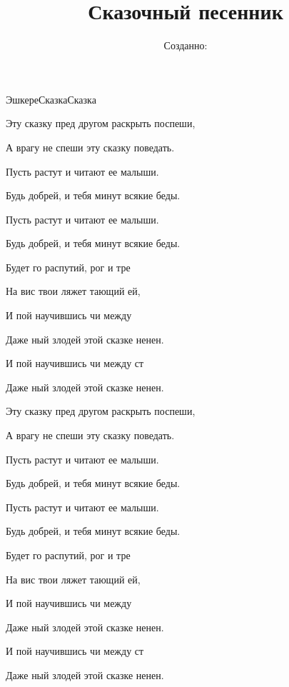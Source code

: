 \documentclass[11pt,a5paper]{book}
\title{ Сказочный песенник}
\author{}
\date{Созданно:  \RevDate}
\begin{document}
 
\maketitle

\mainmatter

\begin{song}{Эшкере}{}{Сказка}{Сказка}{}{}

Эту сказку пред другом раскрыть поспеши,\par
А врагу не спеши эту сказку поведать.\par
Пусть растут и читают ее малыши.\par
Будь добрей, и тебя минут всякие беды.\par
Пусть растут и читают ее малыши.\par
Будь добрей, и тебя минут всякие беды.

\begin{SBVerse*}
Будет го распутий, рог и тре\par
На вис твои ляжет тающий ей, \par
И пой научившись чи между  \par
Даже ный злодей  этой сказке ненен. \par
И пой научившись чи между ст \par
Даже ный злодей  этой сказке ненен.
\end{SBVerse*}

Эту сказку пред другом раскрыть поспеши,\par
А врагу не спеши эту сказку поведать.\par
Пусть растут и читают ее малыши.\par
Будь добрей, и тебя минут всякие беды.\par
Пусть растут и читают ее малыши.\par
Будь добрей, и тебя минут всякие беды.\par
\newpage

\begin{SBVerse*}
Будет го распутий, рог и тре\par
На вис твои ляжет тающий ей, \par
И пой научившись чи между  \par
Даже ный злодей  этой сказке ненен. \par
И пой научившись чи между ст \par
Даже ный злодей  этой сказке ненен.
\end{SBVerse*}


\end{song}
\end{document}
